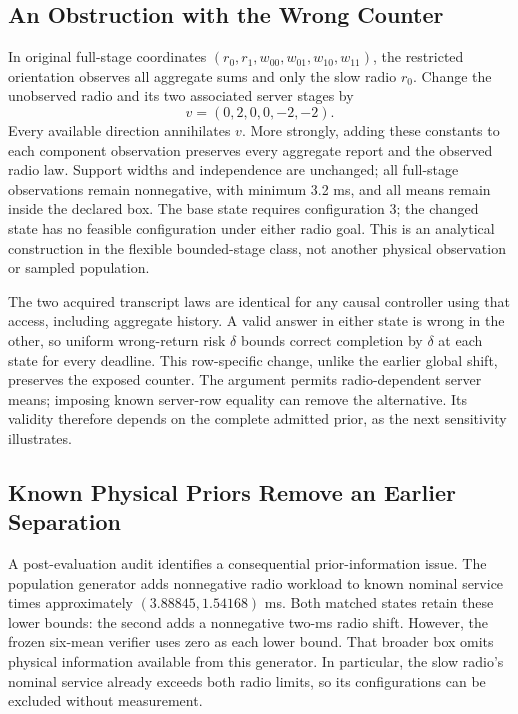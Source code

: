 \subsection{An Obstruction with the Wrong Counter}

In original full-stage coordinates
$(r_0,r_1,w_{00},w_{01},w_{10},w_{11})$, the restricted orientation observes
all aggregate sums and only the slow radio $r_0$. Change the unobserved
radio and its two associated server stages by
$$v=(0,2,0,0,-2,-2).$$
Every available direction annihilates $v$. More strongly, adding these
constants to each component observation preserves every aggregate report
and the observed radio law. Support widths and independence are unchanged;
all full-stage observations remain nonnegative, with minimum 3.2 ms, and
all means remain inside the declared box. The base state requires
configuration 3; the changed state has no feasible configuration under
either radio goal. This is an analytical construction in the flexible
bounded-stage class, not another physical observation or sampled population.

The two acquired transcript laws are identical for any causal controller
using that access, including aggregate history. A valid answer in either
state is wrong in the other, so uniform wrong-return risk $\delta$ bounds
correct completion by $\delta$ at each state for every deadline. This
row-specific change, unlike the earlier global shift, preserves the exposed
counter. The argument permits radio-dependent server means; imposing known
server-row equality can remove the alternative. Its validity therefore
depends on the complete admitted prior, as the next sensitivity illustrates.

\subsection{Known Physical Priors Remove an Earlier Separation}
\label{app:prior-sensitivity}

A post-evaluation audit identifies a consequential prior-information issue.
The population generator adds nonnegative radio workload to known nominal
service times approximately $(3.88845,1.54168)$ ms. Both matched states
retain these lower bounds: the second adds a nonnegative two-ms radio shift.
However, the frozen six-mean verifier uses zero as each lower bound. That
broader box omits physical information available from this generator. In
particular, the slow radio's nominal service already exceeds both radio
limits, so its configurations can be excluded without measurement.

